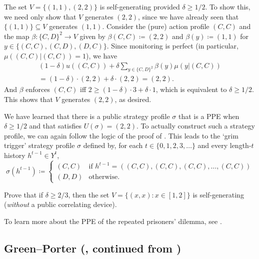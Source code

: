 The set $V = \{ (1,1), (2,2) \}$ is self-generating provided $\delta \geq 1/2$. To show this, we need only show that $V$ generates $(2,2)$, since we have already seen that $\{(1,1)\} \subseteq V$ generates $(1,1)$. Consider the (pure) action profile $(C,C)$ and the map $\beta : \{C,D\}^2 \to V$ given by $\beta(C,C) \coloneqq (2,2)$ and $\beta(y) \coloneqq (1,1)$ for $y \in \{ (C,C), (C,D), (D,C) \}$. Since monitoring is perfect (in particular, $\mu((C,C)|(C,C))=1$), we have
%
\begin{multline*}
	(1-\delta) u((C,C))
	+ \delta \sum_{y \in \{C,D\}^2} \beta(y) \mu(y|(C,C))
	\\
	= (1-\delta) \cdot (2,2)
	+ \delta \cdot (2,2)
	= (2,2) .
\end{multline*}
%
And $\beta$ enforces $(C,C)$ iff $2 \geq (1-\delta) \cdot 3 + \delta \cdot 1$, which is equivalent to $\delta \geq 1/2$. This shows that $V$ generates $(2,2)$, as desired.

We have learned that there is a public strategy profile $\sigma$ that is a PPE when $\delta \geq 1/2$ and that satisfies $U(\sigma)=(2,2)$. To actually construct such a strategy profile, we can again follow the logic of the proof of . This leads to the `grim trigger' strategy profile $\sigma$ defined by, for each $t \in \{0,1,2,3,\dots\}$ and every length-$t$ history $h^{t-1} \in Y^t$,
%
\begin{equation*}
	\sigma\left( h^{t-1} \right) \coloneqq
	\begin{cases}
		(C,C) & \text{if $h^{t-1} = ((C,C),(C,C),(C,C),\dots,(C,C))$} \\
		(D,D) & \text{otherwise.}
	\end{cases}
\end{equation*}

\begin{exercise}
	\label{exercise:rep_pris_selfgen}
	Prove that if $\delta \geq 2/3$, then the set $V = \{ (x,x) : x \in [1,2] \}$ is self-generating (\emph{without} a public correlating device).
\end{exercise}

To learn more about the PPE of the repeated prisoners' dilemma, see \textcite[sections~7.2 and 7.7]{MailathSamuelson2006}.



\subsection{\texorpdfstring{Green--Porter (, continued from )}{Green--Porter (Example \ref{example:greenporter}, continued from p. \pageref{example:greenporter})}}
\label{aps:examples:greenporter_gen}

